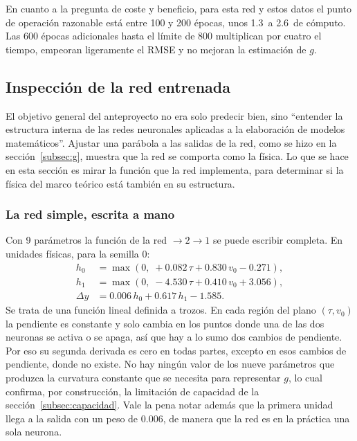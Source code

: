 \documentclass[titlepage,11pt]{article}
\providecommand{\SI}[2]{#1\,#2}
\begin{document}
En cuanto a la pregunta de coste y beneficio, para esta red y estos datos el
punto de operación razonable está entre 100 y 200 épocas, unos
\SI{1.3}{\second} a \SI{2.6}{\second} de cómputo. Las 600 épocas adicionales
hasta el límite de 800 multiplican por cuatro el tiempo, empeoran ligeramente
el RMSE y no mejoran la estimación de $g$.

\subsection{Inspección de la red entrenada}
\label{subsec:pesos}

El objetivo general del anteproyecto no era solo predecir bien, sino
\enquote{entender la estructura interna de las redes neuronales aplicadas a la
elaboración de modelos matemáticos}. Ajustar una parábola a las salidas de la
red, como se hizo en la sección~\ref{subsec:g}, muestra que la red se comporta
como la física. Lo que se hace en esta sección es mirar la función que la red
implementa, para determinar si la física del marco teórico está también en su estructura.

\subsubsection{La red simple, escrita a mano}

Con 9 parámetros la función de la red $\to2\to1$ se puede escribir completa. En
unidades físicas, para la semilla 0:
\begin{align}
  h_0 &= \max(0,\; +0.082\,\tau + 0.830\,v_0 - 0.271), \nonumber\\
  h_1 &= \max(0,\; -4.530\,\tau + 0.410\,v_0 + 3.056), \label{eq:relu_explicita}\\
  \Delta y &= 0.006\,h_0 + 0.617\,h_1 - 1.585. \nonumber
\end{align}
Se trata de una función lineal definida a trozos. En cada región del plano
$(\tau,v_0)$ la pendiente es constante y solo cambia en los puntos donde una
de las dos neuronas se activa o se apaga, así que hay a lo sumo dos cambios de
pendiente. Por eso su segunda derivada es cero en todas partes, excepto en esos
cambios de pendiente, donde no existe. No hay ningún
valor de los nueve parámetros que produzca la curvatura constante que se
necesita para representar $g$, lo cual confirma, por construcción, la limitación de capacidad de la
sección~\ref{subsec:capacidad}. Vale la pena notar además que la primera unidad
llega a la salida con un peso de $0.006$, de manera que la red es en la
práctica una sola neurona.
\end{document}
